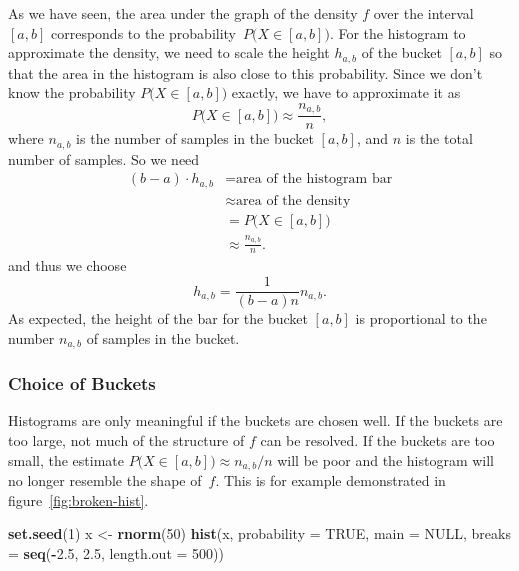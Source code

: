 \documentclass[
  a4paper,
]{article}
\newenvironment{Shaded}{\begin{snugshade}}{\end{snugshade}}
\newcommand{\AttributeTok}[1]{\textcolor[rgb]{0.13,0.29,0.53}{#1}}
\newcommand{\ConstantTok}[1]{\textcolor[rgb]{0.56,0.35,0.01}{#1}}
\newcommand{\DecValTok}[1]{\textcolor[rgb]{0.00,0.00,0.81}{#1}}
\newcommand{\FloatTok}[1]{\textcolor[rgb]{0.00,0.00,0.81}{#1}}
\newcommand{\FunctionTok}[1]{\textcolor[rgb]{0.13,0.29,0.53}{\textbf{#1}}}
\newcommand{\NormalTok}[1]{#1}
\newcommand{\OtherTok}[1]{\textcolor[rgb]{0.56,0.35,0.01}{#1}}
\newcommand{\SpecialCharTok}[1]{\textcolor[rgb]{0.81,0.36,0.00}{\textbf{#1}}}
\theoremstyle{definition}
\theoremstyle{definition}
\theoremstyle{definition}
\theoremstyle{definition}
\theoremstyle{remark}
\begin{document}
As we have seen, the area under the graph of the density \(f\) over the
interval \([a, b]\) corresponds to the probability~\(P\bigl(X \in
[a,b]\bigr)\). For the histogram to approximate the density, we need
to scale the height \(h_{a,b}\) of the bucket \([a, b]\) so that the area
in the histogram is also close to this probability. Since we don't
know the probability \(P\bigl(X \in [a,b]\bigr)\) exactly, we have to
approximate it as
\begin{equation*}
  P\bigl(X \in [a,b]\bigr)
  \approx \frac{n_{a,b}}{n},
\end{equation*}
where \(n_{a,b}\) is the number of samples in the bucket \([a,b]\),
and \(n\) is the total number of samples. So we need
\begin{align*}
  (b-a) \cdot h_{a,b}
    &= \mbox{area of the histogram bar} \\
    &\approx \mbox{area of the density} \\
    &= P\bigl(X \in [a,b]\bigr) \\
    &\approx \frac{n_{a,b}}{n}.
\end{align*}
and thus we choose
\begin{equation*}
  h_{a,b}
  = \frac{1}{(b - a) n} n_{a,b}.
\end{equation*}
As expected, the height of the bar for the bucket \([a,b]\) is proportional
to the number \(n_{a,b}\) of samples in the bucket.

\subsubsection{Choice of Buckets}\label{choice-of-buckets}

Histograms are only meaningful if the buckets are chosen well. If
the buckets are too large, not much of the structure of \(f\) can be
resolved. If the buckets are too small, the estimate \(P\bigl(X \in
[a,b]\bigr) \approx n_{a,b}/n\) will be poor and the histogram will
no longer resemble the shape of~\(f\). This is for example demonstrated
in figure~\ref{fig:broken-hist}.



\begin{Shaded}
\begin{Highlighting}[]
\FunctionTok{set.seed}\NormalTok{(}\DecValTok{1}\NormalTok{)}
\NormalTok{x }\OtherTok{\textless{}{-}} \FunctionTok{rnorm}\NormalTok{(}\DecValTok{50}\NormalTok{)}
\FunctionTok{hist}\NormalTok{(x, }\AttributeTok{probability =} \ConstantTok{TRUE}\NormalTok{, }\AttributeTok{main =} \ConstantTok{NULL}\NormalTok{,}
     \AttributeTok{breaks =} \FunctionTok{seq}\NormalTok{(}\SpecialCharTok{{-}}\FloatTok{2.5}\NormalTok{, }\FloatTok{2.5}\NormalTok{, }\AttributeTok{length.out =} \DecValTok{500}\NormalTok{))}
\end{Highlighting}
\end{Shaded}
\end{document}
